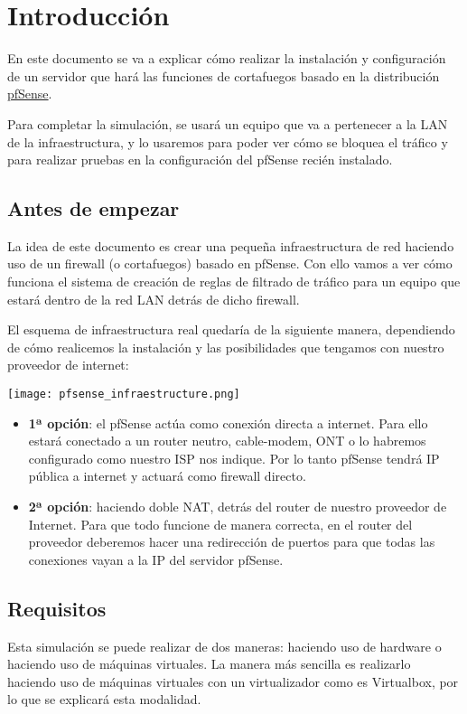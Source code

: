 \chapter{Introducción}

En este documento se va a explicar cómo realizar la instalación y configuración de un servidor que hará las funciones de cortafuegos basado en la distribución \href{https://www.pfsense.org/}{pfSense}.

Para completar la simulación, se usará un equipo que va a pertenecer a la LAN de la infraestructura, y lo usaremos para poder ver cómo se bloquea el tráfico y para realizar pruebas en la configuración del pfSense recién instalado.


\section{Antes de empezar}
La idea de este documento es crear una pequeña infraestructura de red haciendo uso de un firewall (o cortafuegos) basado en pfSense. Con ello vamos a ver cómo funciona el sistema de creación de reglas de filtrado de tráfico para un equipo que estará dentro de la red LAN detrás de dicho firewall.

El esquema de infraestructura real  quedaría de la siguiente manera, dependiendo de cómo realicemos la instalación y las posibilidades que tengamos con nuestro proveedor de internet:

\begin{center}
    \texttt{[image: pfsense\_infraestructure.png]}
\end{center}


\begin{itemize}
    \item \textbf{1ª opción}: el pfSense actúa como conexión directa a internet. Para ello estará conectado a un router neutro, cable-modem, ONT  o lo habremos configurado como nuestro ISP nos indique. Por lo tanto pfSense tendrá IP pública a internet y actuará como firewall directo.
    \item \textbf{2ª opción}: haciendo doble NAT, detrás del router de nuestro proveedor de Internet. Para que todo funcione de manera correcta, en el router del proveedor deberemos hacer una redirección de puertos para que todas las conexiones vayan a la IP del servidor pfSense.
\end{itemize}

\section{Requisitos}
Esta simulación se puede realizar de dos maneras: haciendo uso de hardware o haciendo uso de máquinas virtuales. La manera más sencilla es realizarlo haciendo uso de máquinas virtuales con un virtualizador como es Virtualbox, por lo que se explicará esta modalidad.

